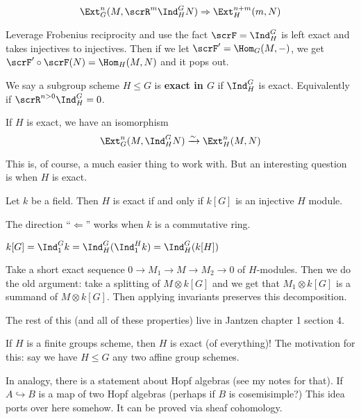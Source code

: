 \documentclass[12pt]{article}
\begin{document}
\begin{prop}
	\[\Ext_G^n(M,\scrR^m\Ind_H^G N)\Rightarrow \Ext_H^{n+m}(m,N)\]
\end{prop}
\begin{prf}
	Leverage Frobenius reciprocity and use the fact $\scrF=\Ind_H^G$ is left exact and takes injectives to injectives. Then if we let $\scrF'=\Hom_G(M,-)$,
	we get $\scrF'\circ\scrF(N)=\Hom_H(M,N)$ and it pops out.
\end{prf}

\begin{defn}
	We say a subgroup scheme $H\le G$ is \textbf{exact in $G$} if $\Ind_H^G$ is exact. Equivalently if 
	$\scrR^{n>0}\Ind_H^G=0$.
\end{defn}
\begin{cor}
	If $H$ is exact, we have an isomorphism 
	\[\Ext_G^n(M,\Ind_H^G N)\xrightarrow{\sim}\Ext_H^n(M,N)\]
\end{cor}
This is, of course, a much easier thing to work with. But an interesting question is when $H$ is exact.
\begin{prop}
	Let $k$ be a field. Then $H$ is exact if and only if $k[G]$ is an injective $H$ module.
\end{prop}
\begin{rmk}
	The direction ``$\Leftarrow$'' works when $k$ is a commutative ring.
\end{rmk}
\begin{rmk}
	$k[G]=\Ind_1^G k=\Ind_H^G(\Ind_1^H k)=\Ind_H^G(k[H])$
\end{rmk}
\begin{prf}
	Take a short exact sequence $0\to M_1\to M\to M_2\to 0$ of $H$-modules. Then we do the old argument:
	take a splitting of $M\otimes k[G]$ and we get that $M_1\otimes k[G]$ is a summand of $M\otimes k[G]$.
	Then applying invariants preserves this decomposition.

	The rest of this (and all of these properties) live in Jantzen chapter 1 section 4.
\end{prf}

\begin{rmk}
	If $H$ is a finite groups scheme, then $H$ is exact (of everything)! The motivation for this: say we have $H\le G$ 
	any two affine group schemes.

	In analogy, there is a statement about Hopf algebras (see my notes for that). If $A\hookrightarrow B$ is a map of two Hopf algebras (perhaps if $B$ is cosemisimple?)
	This idea ports over here somehow. It can be proved via sheaf cohomology.
\end{rmk}
\end{document}
